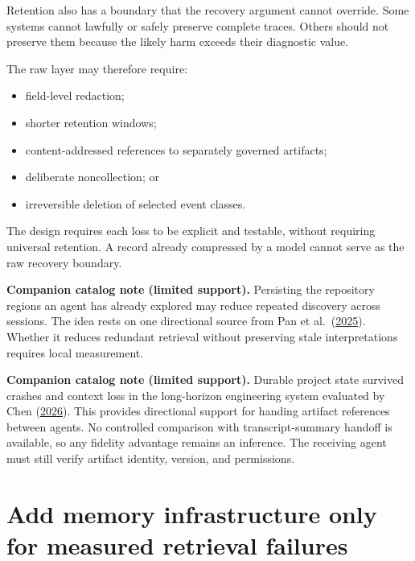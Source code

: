 Retention also has a boundary that the recovery argument cannot override. Some systems cannot lawfully or safely preserve complete traces. Others should not preserve them because the likely harm exceeds their diagnostic value.


The raw layer may therefore require:

\begin{itemize}
\tightlist
\item
  field-level redaction;
\item
  shorter retention windows;
\item
  content-addressed references to separately governed artifacts;
\item
  deliberate noncollection; or
\item
  irreversible deletion of selected event classes.
\end{itemize}

The design requires each loss to be explicit and testable, without requiring universal retention. A record already compressed by a model cannot serve as the raw recovery boundary.

\textbf{Companion catalog note (limited support).} Persisting the repository regions an agent has already explored may reduce repeated discovery across sessions. The idea rests on one directional source from Pan et al.~(\href{https://arxiv.org/abs/2507.19942}{2025}). Whether it reduces redundant retrieval without preserving stale interpretations requires local measurement.

\textbf{Companion catalog note (limited support).} Durable project state survived crashes and context loss in the long-horizon engineering system evaluated by Chen (\href{https://arxiv.org/abs/2604.13018}{2026}). This provides directional support for handing artifact references between agents. No controlled comparison with transcript-summary handoff is available, so any fidelity advantage remains an inference. The receiving agent must still verify artifact identity, version, and permissions.

\hypertarget{add-memory-infrastructure-only-for-measured-retrieval-failures}{%
\section{Add memory infrastructure only for measured retrieval failures}\label{add-memory-infrastructure-only-for-measured-retrieval-failures}}

